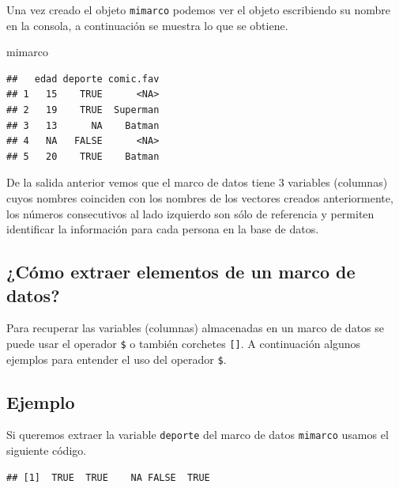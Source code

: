 \documentclass[10pt,]{krantz}
\makeatletter
\newenvironment{Shaded}{\begin{snugshade}}{\end{snugshade}}
\newcommand{\CommentTok}[1]{\textcolor[rgb]{0.56,0.35,0.01}{\textit{#1}}}
\newcommand{\OperatorTok}[1]{\textcolor[rgb]{0.81,0.36,0.00}{\textbf{#1}}}
\newcommand{\NormalTok}[1]{#1}
\newenvironment{kframe}{%
\medskip{}
\setlength{\fboxsep}{.8em}
 \def\at@end@of@kframe{}%
 \ifinner\ifhmode%
  \def\at@end@of@kframe{\end{minipage}}%
  \begin{minipage}{\columnwidth}%
 \fi\fi%
 \def\FrameCommand##1{\hskip\@totalleftmargin \hskip-\fboxsep
 \colorbox{shadecolor}{##1}\hskip-\fboxsep
     \hskip-\linewidth \hskip-\@totalleftmargin \hskip\columnwidth}%
 \MakeFramed {\advance\hsize-\width
   \@totalleftmargin\z@ \linewidth\hsize
   \@setminipage}}%
 {\par\unskip\endMakeFramed%
 \at@end@of@kframe}
\renewenvironment{Shaded}{\begin{kframe}}{\end{kframe}}
\makeatother
\begin{document}
Una vez creado el objeto \texttt{mimarco} podemos ver el objeto
escribiendo su nombre en la consola, a continuación se muestra lo que se
obtiene.

\begin{Shaded}
\begin{Highlighting}[]
\NormalTok{mimarco}
\end{Highlighting}
\end{Shaded}

\begin{verbatim}
##   edad deporte comic.fav
## 1   15    TRUE      <NA>
## 2   19    TRUE  Superman
## 3   13      NA    Batman
## 4   NA   FALSE      <NA>
## 5   20    TRUE    Batman
\end{verbatim}

De la salida anterior vemos que el marco de datos tiene 3 variables
(columnas) cuyos nombres coinciden con los nombres de los vectores
creados anteriormente, los números consecutivos al lado izquierdo son
sólo de referencia y permiten identificar la información para cada
persona en la base de datos.

\subsection{¿Cómo extraer elementos de un marco de
datos?}\label{como-extraer-elementos-de-un-marco-de-datos}

Para recuperar las variables (columnas) almacenadas en un marco de datos
se puede usar el operador \texttt{\$} o también corchetes
\texttt{{[}{]}}. A continuación algunos ejemplos para entender el uso
del operador \texttt{\$}.

\subsection*{Ejemplo}\label{ejemplo-3}


Si queremos extraer la variable \texttt{deporte} del marco de datos
\texttt{mimarco} usamos el siguiente código.

\begin{Shaded}
\end{Shaded}

\begin{verbatim}
## [1]  TRUE  TRUE    NA FALSE  TRUE
\end{verbatim}
\end{document}
